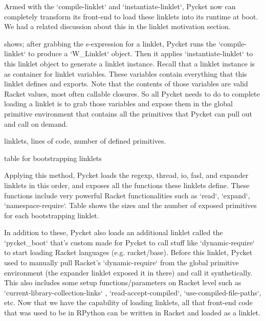 		\begin{paragraph-here}%
			Armed with the `compile-linklet` and `instantiate-linklet`, Pycket now can completely transform its front-end to load these linklets into its runtime at boot. We had a related discussion about this in the linklet motivation section.
		\end{paragraph-here}


		\begin{paragraph-here}%
			 shows; after grabbing the s-expression for a linklet, Pycket runs the `compile-linklet` to produce a `W\_Linklet` object. Then it applies `instantiate-linklet` to this linklet object to generate a linklet instance. Recall that a linklet instance is as container for linklet variables. These variables contain everything that this linklet defines and exports. Note that the contents of those variables are valid Racket values, most often callable closures. So all Pycket needs to do to complete loading a linklet is to grab those variables and expose them in the global primitive environment that contains all the primitives that Pycket can pull out and call on demand.
		\end{paragraph-here}

		\begin{table-here}
			linklets, lines of code, number of defined primitives.

			\begin{todo}
				table for bootstrapping linklets
			\end{todo}
		\end{table-here}

		\begin{paragraph-here}%
			Applying this method, Pycket loads the regexp, thread, io, fasl, and expander linklets in this order, and exposes all the functions these linklets define. These functions include very powerful Racket functionalities such as `read`, `expand`, `namespace-require`. Table shows the sizes and the number of exposed primitives for each bootstrapping linklet.
		\end{paragraph-here}

		\begin{paragraph-here}%
			In addition to these, Pycket also loads an additional linklet called the `pycket\_boot` that's custom made for Pycket to call stuff like `dynamic-require` to start loading Racket languages (e.g. racket/base). Before this linklet, Pycket used to manually pull Racket's `dynamic-require` from the global primitive environment (the expander linklet exposed it in there) and call it synthetically. This also includes some setup functions/parameters on Racket level such as `current-library-collection-links` , `read-accept-compiled`, `use-compiled-file-paths`, etc. Now that we have the capability of loading linklets, all that front-end code that was used to be in RPython can be written in Racket and loaded as a linklet.
		\end{paragraph-here}

